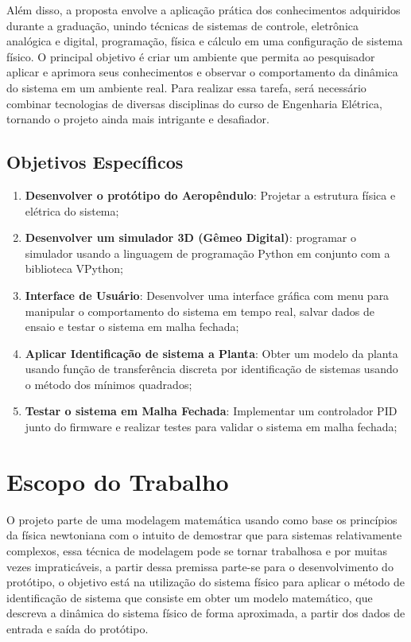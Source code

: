 Além disso, a proposta envolve a aplicação prática dos conhecimentos adquiridos durante a graduação, unindo técnicas de sistemas de controle, eletrônica analógica e digital, programação, física e cálculo em uma configuração de sistema físico. O principal objetivo é criar um ambiente que permita ao pesquisador aplicar e aprimora seus conhecimentos e observar o comportamento da dinâmica do sistema em um ambiente real. Para realizar essa tarefa, será necessário combinar tecnologias de diversas disciplinas do curso de Engenharia Elétrica, tornando o projeto ainda mais intrigante e desafiador.


\subsection{Objetivos Específicos}


\begin{enumerate}[label=\textbf{\alph*.}]
        \setlength{\itemsep}{-2pt}
	\item \textbf{Desenvolver o protótipo do Aeropêndulo}: Projetar a estrutura física e elétrica do sistema;
        \item \textbf{Desenvolver um simulador 3D (Gêmeo Digital)}: programar o simulador usando a linguagem de programação Python em conjunto com a biblioteca VPython;
        \item \textbf{Interface de Usuário}: Desenvolver uma interface gráfica com menu para manipular o comportamento do sistema em tempo real, salvar dados de ensaio e testar o sistema em malha fechada;
        \item \textbf{Aplicar Identificação de sistema a Planta}: Obter um modelo da planta usando função de transferência discreta  por identificação de sistemas usando o método dos mínimos quadrados;
        \item \textbf{Testar o sistema  em Malha Fechada}: Implementar um controlador PID junto do firmware e realizar testes para validar o sistema em malha fechada;
\end{enumerate}


\section{Escopo do Trabalho}

O projeto parte de uma modelagem matemática usando como base os princípios da física newtoniana com o intuito de demostrar que para sistemas relativamente complexos, essa técnica de modelagem pode se tornar trabalhosa e por muitas vezes impraticáveis, a partir dessa premissa parte-se para o desenvolvimento do protótipo, o objetivo está na utilização do sistema físico para aplicar o método de identificação de sistema que consiste em obter um modelo matemático, que descreva a dinâmica do sistema físico de forma aproximada, a partir dos dados de entrada e saída do protótipo.

